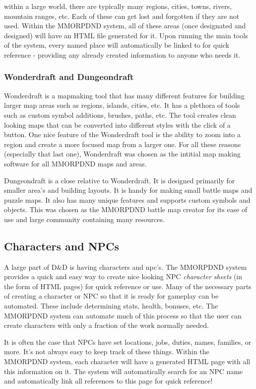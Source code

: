 within a large world, there are typically many regions, cities, towns, rivers, mountain ranges, etc. Each of these can get lost and forgotten if they are not used. Within the MMORPDND system, all of these areas (once designated and designed) will have an HTML file generated for it. Upon running the main tools of the system, every named place will automatically be linked to for quick reference - providing any already created information to anyone who needs it.

\subsubsection{Wonderdraft and Dungeondraft}

Wonderdraft is a mapmaking tool that has many different features for building larger map areas such as regions, islands, cities, etc. It has a plethora of tools such as custom symbol additions, brushes, paths, etc. The tool creates clean looking maps that can be converted into different styles with the click of a button. One nice feature of the Wonderdraft tool is the ability to zoom into a region and create a more focused map from a larger one. For all these reasons (especially that last one), Wonderdraft was chosen as the intitial map making software for all MMORPDND maps and areas.

Dungeondraft is a close relative to Wonderdraft. It is designed primarily for smaller area's and building layouts. It is handy for making small battle maps and puzzle maps. It also has many unique features and supports custom symbols and objects. This was chosen as the MMORPDND battle map creator for its ease of use and large community containing many resources.

\subsection{Characters and NPCs}

A large part of D\&D is having characters and npc's. The MMORPDND system provides a quick and easy way to create nice looking NPC \textit{character sheets} (in the form of HTML pages) for quick reference or use. Many of the necessary parts of creating a character or NPC so that it is ready for gameplay can be automated. These include determining stats, health, bonuses, etc. The MMORPDND system can automate much of this process so that the user can create characters with only a fraction of the work normally needed.

It is often the case that NPCs have set locations, jobs, duties, names, families, or more. It's not always easy to keep track of these things. Within the MMORPDND system, each character will have a generated HTML page with all this information on it. The system will automatically search for an NPC name and automatically link all references to this page for quick reference!

